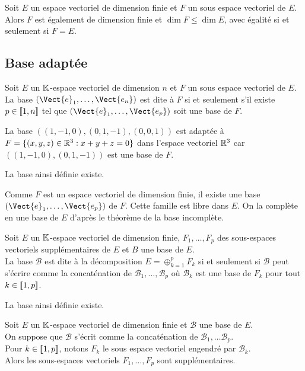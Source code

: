 \documentclass{book}
\begin{document}
\begin{Proposition}
Soit $E$ un espace vectoriel de dimension finie et $F$ un sous espace vectoriel de $E$.\\
Alors $F$ est également de dimension finie et $\dim F \leq \dim E$, avec égalité si et seulement si $F = E$.
\end{Proposition}

\subsection{Base adaptée}

\begin{Definition}
Soit $E$ un $\mathbb{K} $-espace vectoriel de dimension  $n$ et $F$ un sous espace vectoriel de $E$.\\
La base $(\Vect{e}_1,\dots,\Vect{e_n})$ est dite  à $F$
si et seulement s'il existe $p\in \mathopen\lbrack\!\lbrack1,n \mathclose\rbrack\!\rbrack$ tel que $(\Vect{e}_1,\dots,\Vect{e_p})$ soit une base de $F$.
\end{Definition}
\begin{Exemple} La base $((1,-1,0),(0,1,-1),(0,0,1))$ est adaptée à $F=\{(x,y,z)\in\mathbb{R} ^3: x+y+z=0\}$ dans l'espace vectoriel $\mathbb{R} ^3$ car $((1,-1,0),(0,1,-1))$ est une base de $F$. 
\end{Exemple}
\begin{Proposition}
La base ainsi définie existe.
\end{Proposition}
\begin{Demonstration}
Comme $F$ est un espace vectoriel de dimension finie, il existe une base $(\Vect{e}_1,\dots,\Vect{e_p})$ de $F$. Cette famille est libre dans $E$. On la complète en une base de $E$ d'après le théorème de la base incomplète.  
\end{Demonstration}
\begin{Definition}
Soit $E$ un $\mathbb{K} $-espace vectoriel de dimension finie, $F_1,\dots, F_p$ des sous-espaces vectoriels supplémentaires de $E$ et $B$ une base de $E$.\\
La base $\mathcal{B}$ est dite  à la décomposition $E =\oplus_{k=1}^p F_k$ si et seulement si $\mathcal{B}$ peut s'écrire comme la concaténation de $\mathcal{B}_1,\dots,\mathcal{B}_p$ où $\mathcal{B}_k$ est une base de $F_k$ pour tout $k\in \mathopen\lbrack\!\lbrack1,p \mathclose\rbrack\!\rbrack$.
\end{Definition}
\begin{Proposition}
 La base ainsi définie existe.
\end{Proposition}
\begin{Proposition}
\label{prop:base}
Soit $E$ un $\mathbb{K} $-espace vectoriel de dimension finie et $\mathcal{B}$ une base de $E$.\\
On suppose que $\mathcal{B}$ s'écrit comme la concaténation de $\mathcal{B}_1,\dots \mathcal{B}_p$.\\
Pour $k\in \mathopen\lbrack\!\lbrack1,p \mathclose\rbrack\!\rbrack$, notons $F_k$ le sous espace vectoriel engendré par $\mathcal{B}_k$.\\
Alors les sous-espaces vectoriels $F_1,\dots, F_p$ sont supplémentaires.
\end{Proposition}
\end{document}
